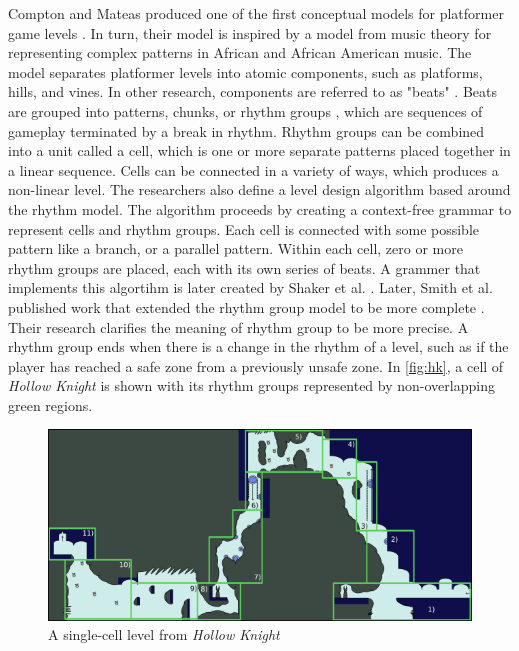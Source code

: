 Compton and Mateas produced one of the first conceptual models for platformer game levels
\cite{compton2006}. In turn, their model is inspired by a model from music theory for
representing complex patterns in African and African American music. The model separates
platformer levels into atomic components, such as platforms, hills, and vines. In other
research, components are referred to as "beats" \cite{dahlskog2012, smith2008}. Beats are
grouped into patterns, chunks, or rhythm groups \cite{dahlskog2012}, which are sequences of
gameplay terminated by a break in rhythm. Rhythm groups can be combined into a unit called a
cell, which is one or more separate patterns placed together in a linear sequence. Cells can
be connected in a variety of ways, which produces a non-linear level. The researchers also
define a level design algorithm based around the rhythm model. The algorithm proceeds by
creating a context-free grammar to represent cells and rhythm groups. Each cell is connected
with some possible pattern like a branch, or a parallel pattern. Within each cell, zero or
more rhythm groups are placed, each with its own series of beats. A grammer that implements
this algortihm is later created by Shaker et al. \cite{shaker2012}. Later, Smith et al.
published work that extended the rhythm group model to be more complete \cite{smith2008}.
Their research clarifies the meaning of rhythm group to be more precise. A rhythm group ends
when there is a change in the rhythm of a level, such as if the player has reached a safe
zone from a previously unsafe zone. In \autoref{fig:hk}, a cell of \emph{Hollow Knight} is
shown with its rhythm groups represented by non-overlapping green regions.

\begin{figure}[ht]
    \centering
    \includegraphics[width=\linewidth]{img/fig5-hk-rhythm.png}
    \caption{A single-cell level from \emph{Hollow Knight}}
    \label{fig:hk}
\end{figure}

